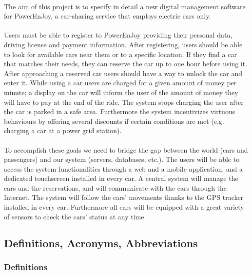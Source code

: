 \documentclass[english]{article}
\begin{document}
\paragraph{}
The aim of this project is to specify in detail a new digital management software for PowerEnJoy, a car-sharing service that employs electric cars only.

\paragraph{}
Users must be able to register to PowerEnJoy providing their personal data, driving license and payment information.
After registering, users should be able to look for available cars near them or to a specific location. If they find a car that matches their needs, they can reserve the car up to one hour before using it. After approaching a reserved car users should have a way to unlock the car and enter it.
While using a car users are charged for a given amount of money per minute; a display on the car will inform the user of the amount of money they will have to pay at the end of the ride.
The system stops charging the user after the car is parked in a safe area.
Furthermore the system incentivizes virtuous behaviours by offering several discounts if certain conditions are met (e.g. charging a car at a power grid station).

\paragraph{}
To accomplish these goals we need to bridge the gap between the world (cars and passengers) and our system (servers, databases, etc.).
The users will be able to access the system functionalities through a web and a mobile application, and a dedicated touchscreen installed in every car.
A central system will manage the cars and the reservations, and will communicate with the cars through the Internet. The system will follow the cars’ movements thanks to the GPS tracker installed in every car. Furthermore all cars will be equipped with a great variety of sensors to check the cars’ status at any time.


\subsection{Definitions, Acronyms, Abbreviations}

\subsubsection{Definitions}
\end{document}
